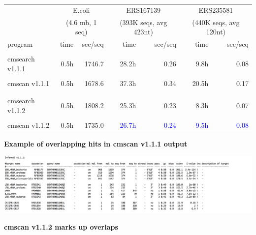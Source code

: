 \documentclass[landscape]{slides}
\begin{document}
\begin{slide}
\begin{slide}
\begin{center}
\begin{tabular}{l|r|r||r|r||r|r||}
         & \multicolumn{2}{c||}{E.coli}  & \multicolumn{2}{c||}{ERS167139} & \multicolumn{2}{c||}{ERS235581} \\
         & \multicolumn{2}{c||}{(4.6 mb, 1 seq)}  & \multicolumn{2}{c||}{(393K seqs, avg 423nt)} & \multicolumn{2}{c||}{(440K seqs, avg 120nt)} \\ \hline
program  & time & sec/seq & time & sec/seq & time & sec/seq \\ \hline
         &      &  & & & & \\
cmsearch v1.1.1  &     0.5h& 1746.7  & 28.2h   & 0.26    & 9.8h    & 0.08 \\
         &      &  & & & & \\
cmscan v1.1.1   &     0.5h& 1678.6  & 37.3h   & 0.34    & 20.5h   & 0.17 \\
         &      &  & & & & \\ \hline
         &      &  & & & & \\ 
cmsearch v1.1.2  &     0.5h& 1808.2  & 25.3h   & 0.23    & 8.3h    & 0.07 \\
         &      &  & & & & \\
cmscan v1.1.2   &     0.5h& 1735.0  & \textcolor{blue}{26.7h}   & \textcolor{blue}{0.24}    & \textcolor{blue}{9.5h}   & \textcolor{blue}{0.08} \\
\end{tabular}

\end{center}
\vfill
\end{slide}
\begin{slide}
\begin{center}
\textbf{Example of overlapping hits in cmscan v1.1.1 output} \\

\medskip
\medskip

\includegraphics[width=10in]{figs/overlap-examples-1p1p1}

\end{center}

\vfill
\end{slide}
\begin{slide}
\begin{center}
\textbf{cmscan v1.1.2 marks up overlaps} \\


\end{center}
\end{slide}
\end{slide}
\end{document}

